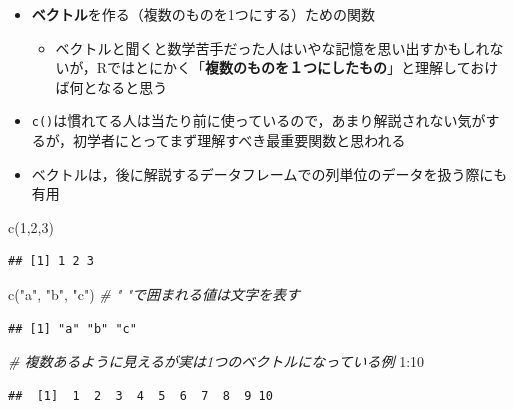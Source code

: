 \documentclass[
  xelatex,ja=standard, b5paper]{bxjsbook}
\newenvironment{Shaded}{\begin{snugshade}}{\end{snugshade}}
\newcommand{\CommentTok}[1]{\textcolor[rgb]{0.56,0.35,0.01}{\textit{#1}}}
\newcommand{\DecValTok}[1]{\textcolor[rgb]{0.00,0.00,0.81}{#1}}
\newcommand{\FunctionTok}[1]{\textcolor[rgb]{0.00,0.00,0.00}{#1}}
\newcommand{\NormalTok}[1]{#1}
\newcommand{\SpecialCharTok}[1]{\textcolor[rgb]{0.00,0.00,0.00}{#1}}
\newcommand{\StringTok}[1]{\textcolor[rgb]{0.31,0.60,0.02}{#1}}
\providecommand{\tightlist}{%
  \setlength{\itemsep}{0pt}\setlength{\parskip}{0pt}}
\begin{document}
\begin{itemize}
\tightlist
\item
  \textbf{ベクトル}を作る（複数のものを1つにする）ための関数

  \begin{itemize}
  \tightlist
  \item
    ベクトルと聞くと数学苦手だった人はいやな記憶を思い出すかもしれないが，Rではとにかく「\textbf{複数のものを１つにしたもの}」と理解しておけば何となると思う
  \end{itemize}
\item
  \texttt{c()}は慣れてる人は当たり前に使っているので，あまり解説されない気がするが，初学者にとってまず理解すべき最重要関数と思われる
\item
  ベクトルは，後に解説するデータフレームでの列単位のデータを扱う際にも有用
\end{itemize}

\begin{Shaded}
\begin{Highlighting}[]
\FunctionTok{c}\NormalTok{(}\DecValTok{1}\NormalTok{,}\DecValTok{2}\NormalTok{,}\DecValTok{3}\NormalTok{)}
\end{Highlighting}
\end{Shaded}

\begin{verbatim}
## [1] 1 2 3
\end{verbatim}

\begin{Shaded}
\begin{Highlighting}[]
\FunctionTok{c}\NormalTok{(}\StringTok{"a"}\NormalTok{, }\StringTok{"b"}\NormalTok{, }\StringTok{"c"}\NormalTok{) }\CommentTok{\# " "で囲まれる値は文字を表す}
\end{Highlighting}
\end{Shaded}

\begin{verbatim}
## [1] "a" "b" "c"
\end{verbatim}

\begin{Shaded}
\begin{Highlighting}[]
\CommentTok{\# 複数あるように見えるが実は1つのベクトルになっている例}
\DecValTok{1}\SpecialCharTok{:}\DecValTok{10}
\end{Highlighting}
\end{Shaded}

\begin{verbatim}
##  [1]  1  2  3  4  5  6  7  8  9 10
\end{verbatim}
\end{document}
